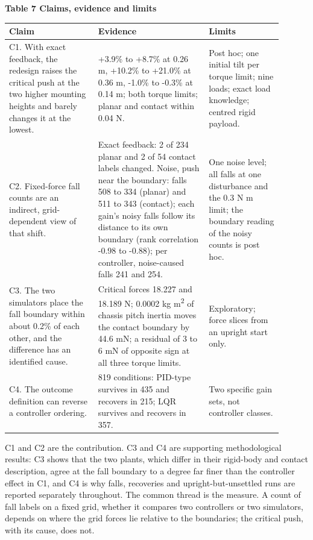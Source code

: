 \documentclass[11pt,a4paper]{article}
\begin{document}
\textbf{Table 7 Claims, evidence and limits}
\begin{longtable}{p{0.297\linewidth}p{0.36\linewidth}p{0.243\linewidth}}
\toprule
Claim & Evidence & Limits \\ \midrule \endhead
C1. With exact feedback, the redesign raises the critical push at the two higher mounting heights and barely changes it at the lowest. & +3.9\% to +8.7\% at 0.26 m, +10.2\% to +21.0\% at 0.36 m, -1.0\% to -0.3\% at 0.14 m; both torque limits; planar and contact within 0.04 N. & Post hoc; one initial tilt per torque limit; nine loads; exact load knowledge; centred rigid payload. \\
C2. Fixed-force fall counts are an indirect, grid-dependent view of that shift. & Exact feedback: 2 of 234 planar and 2 of 54 contact labels changed. Noise, push near the boundary: falls 508 to 334 (planar) and 511 to 343 (contact); each gain's noisy falls follow its distance to its own boundary (rank correlation -0.98 to -0.88); per controller, noise-caused falls 241 and 254. & One noise level; all falls at one disturbance and the 0.3 N m limit; the boundary reading of the noisy counts is post hoc. \\
C3. The two simulators place the fall boundary within about 0.2\% of each other, and the difference has an identified cause. & Critical forces 18.227 and 18.189 N; 0.0002 kg m\textsuperscript{2} of chassis pitch inertia moves the contact boundary by 44.6 mN; a residual of 3 to 6 mN of opposite sign at all three torque limits. & Exploratory; force slices from an upright start only. \\
C4. The outcome definition can reverse a controller ordering. & 819 conditions: PID-type survives in 435 and recovers in 215; LQR survives and recovers in 357. & Two specific gain sets, not controller classes. \\
\bottomrule
\end{longtable}
C1 and C2 are the contribution. C3 and C4 are supporting methodological results: C3 shows that the two plants, which differ in their rigid-body and contact description, agree at the fall boundary to a degree far finer than the controller effect in C1, and C4 is why falls, recoveries and upright-but-unsettled runs are reported separately throughout. The common thread is the measure. A count of fall labels on a fixed grid, whether it compares two controllers or two simulators, depends on where the grid forces lie relative to the boundaries; the critical push, with its cause, does not.
\end{document}
